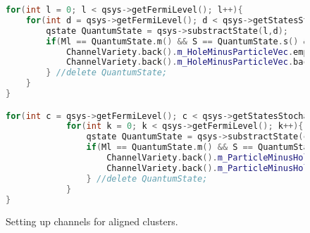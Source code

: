 \documentclass[twoside,english]{uiofysmaster}
\theoremstyle{definition}
\begin{document}
\begin{figure}
	\begin{lstlisting}[language=C++]
for(int l = 0; l < qsys->getFermiLevel(); l++){
	for(int d = qsys->getFermiLevel(); d < qsys->getStatesStochastic(); d++){
		qstate QuantumState = qsys->substractState(l,d);
		if(Ml == QuantumState.m() && S == QuantumState.s() && l != d){
			ChannelVariety.back().m_HoleMinusParticleVec.emplace_back(channelindexpair());
			ChannelVariety.back().m_HoleMinusParticleVec.back().set(l, d);
		} //delete QuantumState;
	}
}

for(int c = qsys->getFermiLevel(); c < qsys->getStatesStochastic(); c++){
         	for(int k = 0; k < qsys->getFermiLevel(); k++){
         		qstate QuantumState = qsys->substractState(c,k);
         		if(Ml == QuantumState.m() && S == QuantumState.s() && c != k){
         			ChannelVariety.back().m_ParticleMinusHoleVec.emplace_back(channelindexpair());
         			ChannelVariety.back().m_ParticleMinusHoleVec.back().set(c, k);
         		} //delete QuantumState;
         	}
}
\end{lstlisting}
\caption{Setting up channels for aligned clusters.} \label{f:vectors_for_channelsHminusP}
\end{figure}
\end{document}
